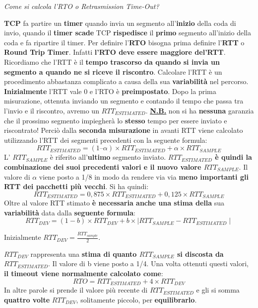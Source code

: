 \documentclass[11pt,a4paper,oneside]{book}
\theoremstyle{definition}
\begin{document}
\pagebreak

\begin{flushleft}
	\textit{Come si calcola l'RTO o Retrasmission Time-Out?}
\end{flushleft}
\textbf{TCP} fa partire un \textbf{timer} quando invia un segmento all'\textbf{inizio} della coda di invio, quando il \textbf{timer scade} TCP \textbf{rispedisce} il \textbf{primo} segmento all'inizio della coda e fa ripartire il timer. Per definire l'\textbf{RTO} bisogna prima definire l'\textbf{RTT} o \textbf{Round Trip Timer}. Infatti \textbf{l'RTO deve essere maggiore del'RTT}. Ricordiamo che l'RTT è il \textbf{tempo trascorso da quando si invia un segmento a quando ne si riceve il riscontro}. Calcolare l'RTT è un procedimento abbastanza complicato a causa della sua \textbf{variabilità} nel percorso.\newline
\textbf{Inizialmente} l'RTT vale 0 e l'RTO è \textbf{preimpostato}. Dopo la prima misurazione, ottenuta inviando un segmento e contando il tempo che passa tra l'invio e il riscontro, avremo un $RTT_{ESTIMATED}$. \newline\newline
\textbf{\underline{N.B.}} non si ha \textbf{nessuna} garanzia che il prossimo segmento impiegherà lo \textbf{stesso} tempo per essere inviato e riscontrato!\newline\newline
Perciò dalla \textbf{seconda misurazione} in avanti RTT viene calcolato utilizzando l'RTT dei segmenti precedenti con la seguente formula:
\begin{equation}
	RTT_{ESTIMATED} = (1 – \alpha) \times RTT_{ESTIMATED} + \alpha \times RTT_{SAMPLE}
\end{equation}
L' $RTT_{SAMPLE}$ è riferito all'\textbf{ultimo} segmento inviato.\textbf{ $RTT_{ESTIMATED}$ è quindi la combinazione dei suoi precedenti valori e il nuovo valore $RTT_{SAMPLE}$}. Il valore di $\alpha$ viene posto a 1/8 in modo da rendere via via \textbf{meno importanti gli RTT dei pacchetti più vecchi}. Si ha quindi:
\begin{equation}
	RTT_{ESTIMATED} = 0,875 \times RTT_{ESTIMATED} + 0,125 \times RTT_{SAMPLE}
\end{equation}
Oltre al valore RTT stimato \textbf{è necessaria anche una stima della} sua \textbf{variabilità} data dalla \textbf{seguente formula}:
\begin{equation}
	RTT_{DEV} = (1 - b) \times RTT_{DEV} + b \times \mid RTT_{SAMPLE} - RTT_{ESTIMATED} \mid
\end{equation}
\begin{flushleft}
	Inizialmente $RTT_{DEV} = \frac{RTT_{sample}}{2}$.
\end{flushleft}
$RTT_{DEV}$ rappresenta una \textbf{stima di quanto $RTT_{SAMPLE}$ si discosta da $RTT_{ESTIMATED}$}. Il valore di b viene posto a 1/4. Una volta ottenuti questi valori, \textbf{il timeout viene normalmente calcolato come}:
\begin{equation}
	RTO = RTT_{ESTIMATED} + 4 \times RTT_{DEV}
\end{equation}
In altre parole si prende il valore più recente di $RTT_{ESTIMATED}$ e gli si somma \textbf{quattro volte} $RTT_{DEV}$, solitamente piccolo, per \textbf{equilibrarlo}.
\end{document}
